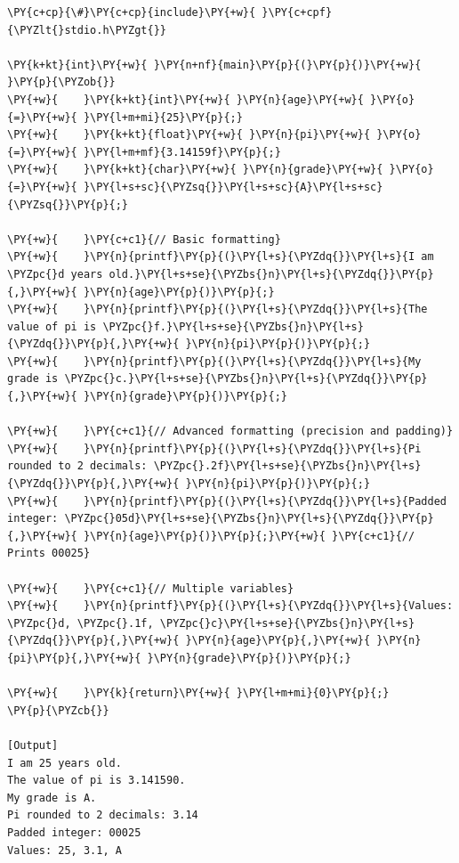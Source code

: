 \begin{Verbatim}[label=\makebox{\url{https://github.com/lucabaldini/cmepda/tree/master/slides/latex/snippets/printf_formatting.c}},commandchars=\\\{\}]
\PY{c+cp}{\#}\PY{c+cp}{include}\PY{+w}{ }\PY{c+cpf}{\PYZlt{}stdio.h\PYZgt{}}

\PY{k+kt}{int}\PY{+w}{ }\PY{n+nf}{main}\PY{p}{(}\PY{p}{)}\PY{+w}{ }\PY{p}{\PYZob{}}
\PY{+w}{    }\PY{k+kt}{int}\PY{+w}{ }\PY{n}{age}\PY{+w}{ }\PY{o}{=}\PY{+w}{ }\PY{l+m+mi}{25}\PY{p}{;}
\PY{+w}{    }\PY{k+kt}{float}\PY{+w}{ }\PY{n}{pi}\PY{+w}{ }\PY{o}{=}\PY{+w}{ }\PY{l+m+mf}{3.14159f}\PY{p}{;}
\PY{+w}{    }\PY{k+kt}{char}\PY{+w}{ }\PY{n}{grade}\PY{+w}{ }\PY{o}{=}\PY{+w}{ }\PY{l+s+sc}{\PYZsq{}}\PY{l+s+sc}{A}\PY{l+s+sc}{\PYZsq{}}\PY{p}{;}

\PY{+w}{    }\PY{c+c1}{// Basic formatting}
\PY{+w}{    }\PY{n}{printf}\PY{p}{(}\PY{l+s}{\PYZdq{}}\PY{l+s}{I am \PYZpc{}d years old.}\PY{l+s+se}{\PYZbs{}n}\PY{l+s}{\PYZdq{}}\PY{p}{,}\PY{+w}{ }\PY{n}{age}\PY{p}{)}\PY{p}{;}
\PY{+w}{    }\PY{n}{printf}\PY{p}{(}\PY{l+s}{\PYZdq{}}\PY{l+s}{The value of pi is \PYZpc{}f.}\PY{l+s+se}{\PYZbs{}n}\PY{l+s}{\PYZdq{}}\PY{p}{,}\PY{+w}{ }\PY{n}{pi}\PY{p}{)}\PY{p}{;}
\PY{+w}{    }\PY{n}{printf}\PY{p}{(}\PY{l+s}{\PYZdq{}}\PY{l+s}{My grade is \PYZpc{}c.}\PY{l+s+se}{\PYZbs{}n}\PY{l+s}{\PYZdq{}}\PY{p}{,}\PY{+w}{ }\PY{n}{grade}\PY{p}{)}\PY{p}{;}

\PY{+w}{    }\PY{c+c1}{// Advanced formatting (precision and padding)}
\PY{+w}{    }\PY{n}{printf}\PY{p}{(}\PY{l+s}{\PYZdq{}}\PY{l+s}{Pi rounded to 2 decimals: \PYZpc{}.2f}\PY{l+s+se}{\PYZbs{}n}\PY{l+s}{\PYZdq{}}\PY{p}{,}\PY{+w}{ }\PY{n}{pi}\PY{p}{)}\PY{p}{;}
\PY{+w}{    }\PY{n}{printf}\PY{p}{(}\PY{l+s}{\PYZdq{}}\PY{l+s}{Padded integer: \PYZpc{}05d}\PY{l+s+se}{\PYZbs{}n}\PY{l+s}{\PYZdq{}}\PY{p}{,}\PY{+w}{ }\PY{n}{age}\PY{p}{)}\PY{p}{;}\PY{+w}{ }\PY{c+c1}{// Prints 00025}

\PY{+w}{    }\PY{c+c1}{// Multiple variables}
\PY{+w}{    }\PY{n}{printf}\PY{p}{(}\PY{l+s}{\PYZdq{}}\PY{l+s}{Values: \PYZpc{}d, \PYZpc{}.1f, \PYZpc{}c}\PY{l+s+se}{\PYZbs{}n}\PY{l+s}{\PYZdq{}}\PY{p}{,}\PY{+w}{ }\PY{n}{age}\PY{p}{,}\PY{+w}{ }\PY{n}{pi}\PY{p}{,}\PY{+w}{ }\PY{n}{grade}\PY{p}{)}\PY{p}{;}

\PY{+w}{    }\PY{k}{return}\PY{+w}{ }\PY{l+m+mi}{0}\PY{p}{;}
\PY{p}{\PYZcb{}}

[Output]
I am 25 years old.
The value of pi is 3.141590.
My grade is A.
Pi rounded to 2 decimals: 3.14
Padded integer: 00025
Values: 25, 3.1, A
\end{Verbatim}